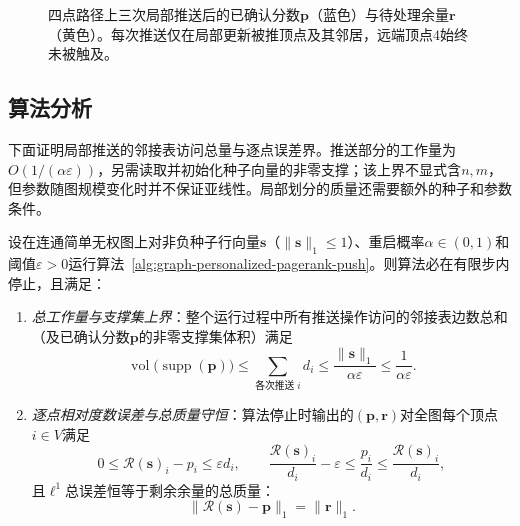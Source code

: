 \begin{figure}[!htb]
\caption{四点路径上三次局部推送后的已确认分数$\bm{p}$（蓝色）与待处理余量$\bm{r}$（黄色）。每次推送仅在局部更新被推顶点及其邻居，远端顶点$4$始终未被触及。}
\label{fig:pagerank-push-evolution}
\end{figure}

\subsection{算法分析}
\label{sec:graph-pagerank-push-analysis}

下面证明局部推送的邻接表访问总量与逐点误差界。推送部分的工作量为$O(1/(\alpha\varepsilon))$，另需读取并初始化种子向量的非零支撑；该上界不显式含$n,m$，但参数随图规模变化时并不保证亚线性。局部划分的质量还需要额外的种子和参数条件。

\begin{theorem}[局部推送算法的复杂度与逐点误差界]
\label{thm:graph-pagerank-push-guarantee}
设在连通简单无权图上对非负种子行向量$\bm s$（$\lVert\bm s\rVert_1\leq 1$）、重启概率$\alpha\in(0,1)$和阈值$\varepsilon>0$运行算法~\ref{alg:graph-personalized-pagerank-push}。则算法必在有限步内停止，且满足：
\begin{enumerate}
  \item \emph{总工作量与支撑集上界}：整个运行过程中所有推送操作访问的邻接表边数总和（及已确认分数$\bm p$的非零支撑集体积）满足
  \begin{equation}
  \operatorname{vol}\bigl(\operatorname{supp}(\bm p)\bigr)
  \le \sum_{\text{各次推送}\;i}d_i
  \le \frac{\lVert\bm s\rVert_1}{\alpha\varepsilon}
  \le \frac{1}{\alpha\varepsilon}.
  \label{eq:graph-pagerank-push-work}
  \end{equation}
  \item \emph{逐点相对度数误差与总质量守恒}：算法停止时输出的$(\bm p,\bm r)$对全图每个顶点$i\in V$满足
  \begin{equation}
  0\le\mathcal{R}(\bm{s})_i-p_i\le\varepsilon d_i,
  \qquad
  \frac{\mathcal{R}(\bm s)_i}{d_i} - \varepsilon \le \frac{p_i}{d_i} \le \frac{\mathcal{R}(\bm s)_i}{d_i},
  \label{eq:graph-pagerank-push-pointwise}
  \end{equation}
  且$\ell^1$总误差恒等于剩余余量的总质量：
  \begin{equation}
  \lVert\mathcal{R}(\bm{s})-\bm{p}\rVert_1=\lVert\bm{r}\rVert_1.
  \label{eq:graph-pagerank-push-mass}
  \end{equation}
\end{enumerate}
\end{theorem}

